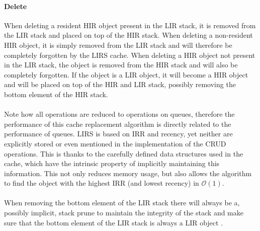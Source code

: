 \documentclass[pdftex,a4paper,12pt,twoside]{report}
\begin{document}
\paragraph{Delete} When deleting a resident HIR object present in the LIR stack, it is removed from the LIR stack and placed on top of the HIR stack. When deleting a non-resident HIR object, it is simply removed from the LIR stack and will therefore be completely forgotten by the LIRS cache. When deleting a HIR object not present in the LIR stack, the object is removed from the HIR stack and will also be completely forgotten. If the object is a LIR object, it will become a HIR object and will be placed on top of the HIR and LIR stack, possibly removing the bottom element of the HIR stack.
\\\\
Note how all operations are reduced to operations on queues, therefore the performance of this cache replacement algorithm is directly related to the performance of queues. LIRS is based on IRR and recency, yet neither are explicitly stored or even mentioned in the implementation of the CRUD operations. This is thanks to the carefully defined data structures used in the cache, which have the intrinsic property of implicitly maintaining this information. This not only reduces memory usage, but also allows the algorithm to find the object with the highest IRR (and lowest recency) in $\mathcal{O}(1)$.
\\\\
When removing the bottom element of the LIR stack there will always be a, possibly implicit, stack prune to maintain the integrity of the stack and make sure that the bottom element of the LIR stack is always a LIR object \citep{jiang2002lirs}.
\end{document}

